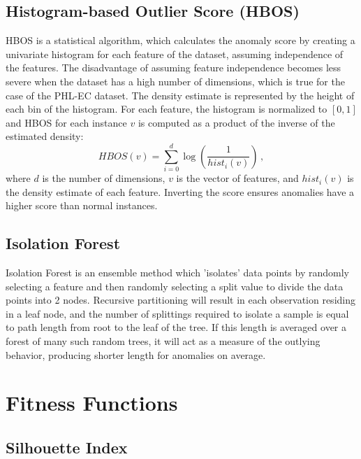 \documentclass[fleqn,usenatbib]{mnras}
\newcommand{\be}{\begin{equation}}
\newcommand{\ee}{\end{equation}}
\def\be{\begin{equation}}
\def\ee{\end{equation}}
\begin{document}
\subsection{Histogram-based Outlier Score (HBOS)}

HBOS is a statistical algorithm, which calculates the anomaly score by creating a univariate histogram for each feature of the dataset, assuming independence of the features. The disadvantage of assuming feature independence becomes less severe when the dataset has a high number of dimensions, which is true for the case of the PHL-EC dataset. The density estimate is represented by the height of each bin of the histogram. For each feature, the histogram is normalized to $[0,1]$ and HBOS for each instance $v$ is computed as a product of the inverse of the estimated density:
\be
HBOS(v) = \sum\limits_{i=0}^d \log{\left (\frac{1}{hist_i(v)}\right)}\,,
\ee
where $d$ is the number of dimensions, $v$ is the vector of features, and $hist_i(v)$ is the density estimate of each feature. Inverting the score ensures anomalies have a higher score than normal instances. 

\subsection{Isolation Forest}

Isolation Forest is an ensemble method which 'isolates' data points by randomly selecting a feature and then randomly selecting a split value to divide the data points into 2 nodes. Recursive partitioning will result in each observation residing in a leaf node, and the number of splittings required to isolate a sample is equal to path length from root to the leaf of the tree. If this length is averaged over a forest of many such random trees, it will act as a measure of the outlying behavior, producing shorter length for anomalies on average.

\section{Fitness Functions}\label{appendix:fitness}

\subsection{Silhouette Index}
\end{document}
